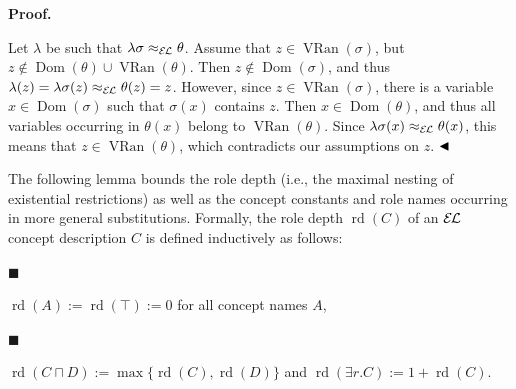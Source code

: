  
 
 
\par\medskip\noindent\textbf{Proof.}\par
 
 
Let $\lambda$ be such that $\lambda\sigma\approx_{\mathcal{E\mkern-1.618muL}}\theta$. Assume that $z\in\operatorname{VRan}(\sigma)$, but $z\notin\operatorname{Dom}(\theta)\cup\operatorname{VRan}(\theta)$. Then $z\not\in\operatorname{Dom}(\sigma)$, and thus $\lambda(z)=\lambda\sigma(z)\approx_{\mathcal{E\mkern-1.618muL}}\theta(z)=z$. However, since $z\in\operatorname{VRan}(\sigma)$, there is a variable $x\in\operatorname{Dom}(\sigma)$ such that $\sigma(x)$ contains $z$. Then $x\in\operatorname{Dom}(\theta)$, and thus all variables occurring in $\theta(x)$ belong to $\operatorname{VRan}(\theta)$. Since $\lambda\sigma(x)\approx_{\mathcal{E\mkern-1.618muL}}\theta(x)$, this means that $z\in\operatorname{VRan}(\theta)$, which contradicts our assumptions on $z$. $\hfill\blacktriangleleft$\par
 
 
 
The following lemma bounds the role depth (i.e., the maximal nesting of existential restrictions) as well as the concept constants and role names occurring in more general substitutions. Formally, the role depth $\operatorname{rd}(C)$ of an $\mathcal{E\mkern-1.618muL}$ concept description $C$ is defined inductively as follows:\par
  
\par\noindent  $\blacksquare$ 
 
$\operatorname{rd}(A):=\operatorname{rd}(\top):=0$ for all concept names $A$,\par
 
 
 
\par\noindent  $\blacksquare$ 
 
$\operatorname{rd}(C\sqcap D):=\max\{\operatorname{rd}(C),\operatorname{rd}(D)\}$ and $\operatorname{rd}(\exists r.C):=1+\operatorname{rd}(C)$.\par
 
 

